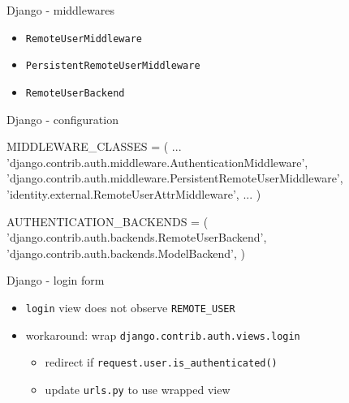 \documentclass[ignorenonframetext,aspectratio=169]{beamer}
\newenvironment{Shaded}{}{}
\newcommand{\StringTok}[1]{\textcolor[rgb]{0.25,0.44,0.63}{{#1}}}
\newcommand{\OperatorTok}[1]{\textcolor[rgb]{0.40,0.40,0.40}{{#1}}}
\newcommand{\NormalTok}[1]{{#1}}
\providecommand{\tightlist}{%
  \setlength{\itemsep}{0pt}\setlength{\parskip}{0pt}}
\begin{document}
\begin{frame}{Django - middlewares}
\begin{itemize}
\tightlist

\item {\tt RemoteUserMiddleware}
\item {\tt PersistentRemoteUserMiddleware}
\item {\tt RemoteUserBackend}

\end{itemize}
\end{frame}

\begin{frame}[fragile]{Django - configuration}
\begin{Shaded}
\begin{Highlighting}[]
\NormalTok{MIDDLEWARE_CLASSES }\OperatorTok{=} \NormalTok{(}
 \NormalTok{...}
 \StringTok{'django.contrib.auth.middleware.AuthenticationMiddleware'}\NormalTok{,}
 \StringTok{'django.contrib.auth.middleware.PersistentRemoteUserMiddleware'}\NormalTok{,}
 \StringTok{'identity.external.RemoteUserAttrMiddleware'}\NormalTok{,}
 \NormalTok{...}
\NormalTok{)}

\NormalTok{AUTHENTICATION_BACKENDS }\OperatorTok{=} \NormalTok{(}
  \StringTok{'django.contrib.auth.backends.RemoteUserBackend'}\NormalTok{,}
  \StringTok{'django.contrib.auth.backends.ModelBackend'}\NormalTok{,}
\NormalTok{)}
\end{Highlighting}
\end{Shaded}
\end{frame}

\begin{frame}{Django - login form}
\begin{itemize}
\tightlist

\item {\tt login} view does not observe {\tt REMOTE\_USER}

\item workaround: wrap {\tt django.contrib.auth.views.login}

    \begin{itemize}
    \tightlist
    \item redirect if {\tt request.user.is\_authenticated()}
    \item update {\tt urls.py} to use wrapped view
    \end{itemize}

\end{itemize}
\end{frame}
\end{document}
